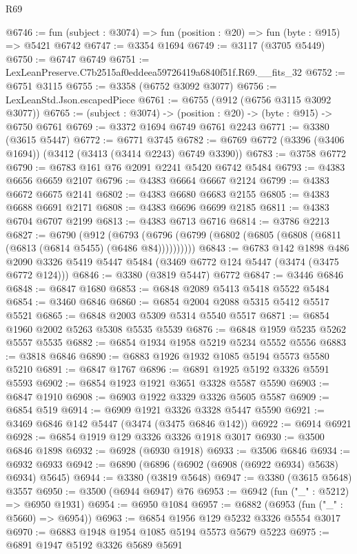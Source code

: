 \begin{lexlean}{R69}
\begin{coremodule}
@6746 := fun (subject : @3074) => fun (position : @20) => fun (byte : @915) => @5421 @6742
@6747 := @3354 @1694
@6749 := @3117 (@3705 @5449)
@6750 := @6747 @6749
@6751 := LexLeanPreserve.C7b2515af0eddeea59726419a6840f51f.R69.__fits_32
@6752 := @6751 @3115
@6755 := @3358 (@6752 @3092 @3077)
@6756 := LexLeanStd.Json.escapedPiece
@6761 := @6755 (@912 (@6756 @3115 @3092 @3077))
@6765 := (subject : @3074) -> (position : @20) -> (byte : @915) -> @6750 @6761
@6769 := @3372 @1694 @6749 @6761 @2243
@6771 := @3380 (@3615 @5447)
@6772 := @6771 @3745
@6782 := @6769 @6772 (@3396 (@3406 @1694)) (@3412 (@3413 (@3414 @2243) @6749 @3390))
@6783 := @3758 @6772
@6790 := @6783 @161 @76 @2091 @2241 @5420 @6742 @5484
@6793 := @4383 @6656 @6659 @2107
@6796 := @4383 @6664 @6667 @2124
@6799 := @4383 @6672 @6675 @2141
@6802 := @4383 @6680 @6683 @2155
@6805 := @4383 @6688 @6691 @2171
@6808 := @4383 @6696 @6699 @2185
@6811 := @4383 @6704 @6707 @2199
@6813 := @4383 @6713 @6716
@6814 := @3786 @2213
@6827 := @6790
    (@912 (@6793 (@6796 (@6799 (@6802 (@6805 (@6808 (@6811 (@6813 (@6814 @5455) (@6486 @84))))))))))
@6843 := @6783
    @142
    @1898
    @486
    @2090
    @3326
    @5419
    @5447
    @5484
    (@3469 @6772 @124 @5447 (@3474 (@3475 @6772 @124)))
@6846 := @3380 (@3819 @5447) @6772
@6847 := @3446 @6846
@6848 := @6847 @1680
@6853 := @6848 @2089 @5413 @5418 @5522 @5484
@6854 := @3460 @6846
@6860 := @6854 @2004 @2088 @5315 @5412 @5517 @5521
@6865 := @6848 @2003 @5309 @5314 @5540 @5517
@6871 := @6854 @1960 @2002 @5263 @5308 @5535 @5539
@6876 := @6848 @1959 @5235 @5262 @5557 @5535
@6882 := @6854 @1934 @1958 @5219 @5234 @5552 @5556
@6883 := @3818 @6846
@6890 := @6883 @1926 @1932 @1085 @5194 @5573 @5580 @5210
@6891 := @6847 @1767
@6896 := @6891 @1925 @5192 @3326 @5591 @5593
@6902 := @6854 @1923 @1921 @3651 @3328 @5587 @5590
@6903 := @6847 @1910
@6908 := @6903 @1922 @3329 @3326 @5605 @5587
@6909 := @6854 @519
@6914 := @6909 @1921 @3326 @3328 @5447 @5590
@6921 := @3469 @6846 @142 @5447 (@3474 (@3475 @6846 @142))
@6922 := @6914 @6921
@6928 := @6854 @1919 @129 @3326 @3326 @1918 @3017
@6930 := @3500 @6846 @1898
@6932 := @6928 (@6930 @1918)
@6933 := @3506 @6846
@6934 := @6932 @6933
@6942 := @6890 (@6896 (@6902 (@6908 (@6922 @6934) @5638) @6934) @5645)
@6944 := @3380 (@3819 @5648)
@6947 := @3380 (@3615 @5648) @3557
@6950 := @3500 (@6944 @6947) @76
@6953 := @6942 (fun ("_" : @5212) => @6950 @1931)
@6954 := @6950 @1084
@6957 := @6882 (@6953 (fun ("_" : @5660) => @6954))
@6963 := @6854 @1956 @129 @5232 @3326 @5554 @3017
@6970 := @6883 @1948 @1954 @1085 @5194 @5573 @5679 @5223
@6975 := @6891 @1947 @5192 @3326 @5689 @5691

\end{coremodule}
\end{lexlean}

